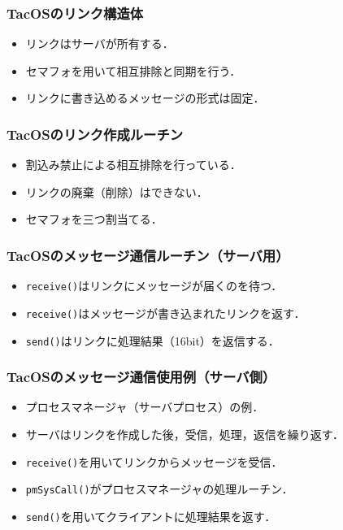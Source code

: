 \documentclass[dvipdfmx]{beamer}
\begin{document}
\begin{frame}
  \frametitle{TacOSのリンク構造体}
  
  \begin{itemize}
  \item リンクはサーバが所有する．
  \item セマフォを用いて相互排除と同期を行う．
  \item リンクに書き込めるメッセージの形式は固定．
  \end{itemize}
\end{frame}

\begin{frame}
  \frametitle{TacOSのリンク作成ルーチン}
  
  \begin{itemize}
  \item 割込み禁止による相互排除を行っている．
  \item リンクの廃棄（削除）はできない．
  \item セマフォを三つ割当てる．
  \end{itemize}
\end{frame}

\begin{frame}
  \frametitle{TacOSのメッセージ通信ルーチン（サーバ用）}
  
  \begin{itemize}
  \item {\tt receive()}はリンクにメッセージが届くのを待つ．
  \item {\tt receive()}はメッセージが書き込まれたリンクを返す．
  \item {\tt send()}はリンクに処理結果（16bit）を返信する．
  \end{itemize}
\end{frame}

\begin{frame}
  \frametitle{TacOSのメッセージ通信使用例（サーバ側）}
  
  \begin{itemize}
  \item プロセスマネージャ（サーバプロセス）の例．
  \item サーバはリンクを作成した後，受信，処理，返信を繰り返す．
  \item {\tt receive()}を用いてリンクからメッセージを受信．
  \item {\tt pmSysCall()}がプロセスマネージャの処理ルーチン．
  \item {\tt send()}を用いてクライアントに処理結果を返す．
  \end{itemize}
\end{frame}
\end{document}
